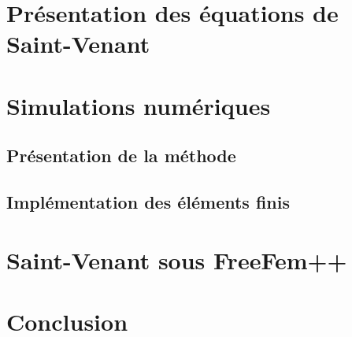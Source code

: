 \documentclass{report}
\begin{document}



\chapter{Présentation des équations de Saint-Venant}



\chapter{Simulations numériques}
\section{Présentation de la méthode}

\section{Implémentation des éléments finis}

\chapter{Saint-Venant sous FreeFem++}


\chapter{Conclusion}
\end{document}
